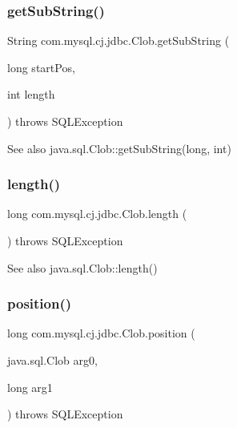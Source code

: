 \subsubsection{\texorpdfstring{get\+Sub\+String()}{getSubString()}}
{\footnotesize\ttfamily String com.\+mysql.\+cj.\+jdbc.\+Clob.\+get\+Sub\+String (\begin{DoxyParamCaption}\item[{long}]{start\+Pos,  }\item[{int}]{length }\end{DoxyParamCaption}) throws S\+Q\+L\+Exception}

\begin{DoxySeeAlso}{See also}
java.\+sql.\+Clob\+::get\+Sub\+String(long, int) 
\end{DoxySeeAlso}
\mbox{\label{classcom_1_1mysql_1_1cj_1_1jdbc_1_1_clob_a34d1c1c51a7cab4cb589c6743f78f3d1}} 
\subsubsection{\texorpdfstring{length()}{length()}}
{\footnotesize\ttfamily long com.\+mysql.\+cj.\+jdbc.\+Clob.\+length (\begin{DoxyParamCaption}{ }\end{DoxyParamCaption}) throws S\+Q\+L\+Exception}

\begin{DoxySeeAlso}{See also}
java.\+sql.\+Clob\+::length() 
\end{DoxySeeAlso}
\mbox{\label{classcom_1_1mysql_1_1cj_1_1jdbc_1_1_clob_a94dca4c47b990167d6ab98c87ae43ce4}} 
\subsubsection{\texorpdfstring{position()}{position()}\hspace{0.1cm}{\footnotesize\ttfamily [1/2]}}
{\footnotesize\ttfamily long com.\+mysql.\+cj.\+jdbc.\+Clob.\+position (\begin{DoxyParamCaption}\item[{java.\+sql.\+Clob}]{arg0,  }\item[{long}]{arg1 }\end{DoxyParamCaption}) throws S\+Q\+L\+Exception}

